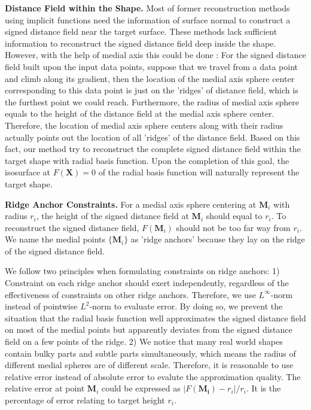 \documentclass[annual]{acmsiggraph}
\begin{document}
\textbf{Distance Field within the Shape. }
Most of former reconstruction methods using implicit functions need the information of surface normal to construct a signed distance field near the target surface. These methods lack sufficient information to reconstruct the signed distance field deep inside the shape. However, with the help of medial axis this could be done : For the signed distance field built upon the input data points, suppose that we travel from a data point and climb along its gradient, then the location of the medial axis sphere center corresponding to this data point is just on the 'ridges' of distance field, which is the furthest point we could reach. Furthermore, the radius of medial axis sphere equals to the height of the distance field at the medial axis sphere center. Therefore, the location of medial axis sphere centers along with their radius actually points out the location of all 'ridges' of the distance field. Based on this fact, our method try to reconstruct the complete signed distance field within the target shape with radial basis function. Upon the completion of this goal, the isosurface at $F(\mathbf{X})=0$ of the radial basis function will naturally represent the target shape.

\textbf{Ridge Anchor Constraints. }
For a medial axis sphere centering at $\mathbf{M}_i$ with radius $r_i$, the height of the signed distance field at $\mathbf{M}_i$ should equal to $r_i$. To reconstruct the signed distance field, $F(\mathbf{M}_i)$ should not be too far way from $r_i$. We name the medial points $\{\mathbf{M}_i\}$ as 'ridge anchors' because they lay on the ridge of the signed distance field. 

We follow two principles when formulating constraints on ridge anchors: 1) Constraint on each ridge anchor should exert independently, regardless of the effectiveness of constraints on other ridge anchors. Therefore, we use $L^{\infty}$-norm instead of pointwise $L^2$-norm to evaluate error. By doing so, we prevent the situation that the radial basis function well approximates the signed distance field on most of the medial points but apparently deviates from the signed distance field on a few points of the ridge. 2) We notice that many real world shapes contain bulky parts and subtle parts simultaneously, which means the radius of different medial spheres are of different scale. Therefore, it is reasonable to use relative error instead of absolute error to evalute the approximation quality. The relative error at point $\mathbf{M}_i$ could be expressed as $|F(\mathbf{M_i})-r_i|/r_i$. It is the percentage of error relating to target height $r_i$.
\end{document}
